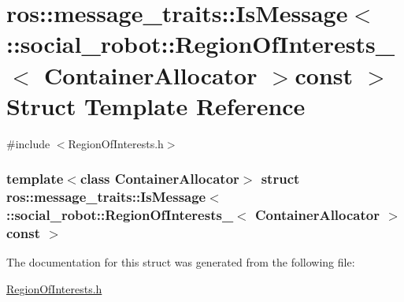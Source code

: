 \hypertarget{structros_1_1message__traits_1_1IsMessage_3_01_1_1social__robot_1_1RegionOfInterests___3_01ContainerAllocator_01_4const_01_01_4}{
\section{ros::message\_\-traits::IsMessage$<$ ::social\_\-robot::RegionOfInterests\_\-$<$ ContainerAllocator $>$const $>$ Struct Template Reference}
\label{structros_1_1message__traits_1_1IsMessage_3_01_1_1social__robot_1_1RegionOfInterests___3_01ContainerAllocator_01_4const_01_01_4}
}


{\ttfamily \#include $<$RegionOfInterests.h$>$}

\subsubsection*{template$<$class ContainerAllocator$>$ struct ros::message\_\-traits::IsMessage$<$ ::social\_\-robot::RegionOfInterests\_\-$<$ ContainerAllocator $>$const  $>$}



The documentation for this struct was generated from the following file:\begin{DoxyCompactItemize}
\item 
\hyperlink{RegionOfInterests_8h}{RegionOfInterests.h}\end{DoxyCompactItemize}
